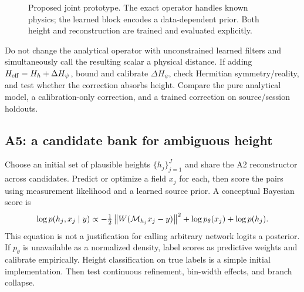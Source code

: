 \begin{figure}[htbp]\centering
{}
\caption{Proposed joint prototype. The exact operator handles known physics; the learned block encodes a data-dependent prior. Both height and reconstruction are trained and evaluated explicitly.}
\end{figure}

Do not change the analytical operator with unconstrained learned filters and simultaneously call the resulting scalar a physical distance. If adding $H_{\rm eff}=H_h+\Delta H_\psi$, bound and calibrate $\Delta H_\psi$, check Hermitian symmetry/reality, and test whether the correction absorbs height. Compare the pure analytical model, a calibration-only correction, and a trained correction on source/session holdouts.

\subsection{A5: a candidate bank for ambiguous height}
Choose an initial set of plausible heights $\{h_j\}_{j=1}^J$ and share the A2 reconstructor across candidates. Predict or optimize a field $x_j$ for each, then score the pairs using measurement likelihood and a learned source prior. A conceptual Bayesian score is
\begin{equation}
 \log p(h_j,x_j\mid y)\propto
 -\tfrac12\left\lVert W(\mathcal M_{h_j}x_j-y)\right\rVert^2+\log p_\theta(x_j)+\log p(h_j).
\end{equation}
This equation is not a justification for calling arbitrary network logits a posterior. If $p_\theta$ is unavailable as a normalized density, label scores as predictive weights and calibrate empirically. Height classification on true labels is a simple initial implementation. Then test continuous refinement, bin-width effects, and branch collapse.


